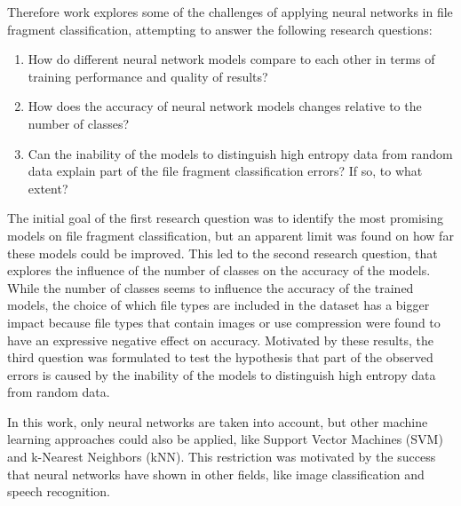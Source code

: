 Therefore work explores some of the challenges of applying neural networks in file fragment classification, attempting to answer the following research questions:

\begin{enumerate}[itemindent=\parindent,label=\textbf{Q\arabic*.}]

    \item How do different neural network models compare to each other in terms of training performance and quality of results?
    
    \item How does the accuracy of neural network models changes relative to the number of classes?

    \item Can the inability of the models to distinguish high entropy data from random data explain part of the file fragment classification errors? If so, to what extent?
\end{enumerate}

The initial goal of the first research question was to identify the most promising models on file fragment classification, but an apparent limit was found on how far these models could be improved.
This led to the second research question, that explores the influence of the number of classes on the accuracy of the models. While the number of classes seems to influence the accuracy of the trained models, the choice of which file types are included in the dataset has a bigger impact because file types that contain images or use compression were found to have an expressive negative effect on accuracy.
Motivated by these results, the third question was formulated to test the hypothesis that part of the observed errors is caused by the inability of the models to distinguish high entropy data from random data.


In this work, only neural networks are taken into account, but other machine learning approaches could also be applied, like Support Vector Machines (SVM) and k-Nearest Neighbors (kNN). This restriction was motivated by the success that neural networks have shown in other fields, like image classification and speech recognition.
